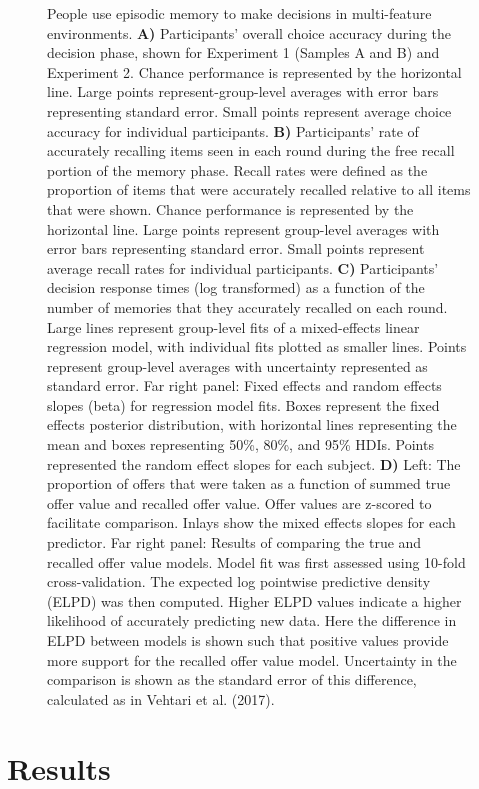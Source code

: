 \documentclass[10pt,letterpaper]{article}
\begin{document}
\begin{figure}[t]
    \caption{People use episodic memory to make decisions in multi-feature environments. \textbf{A)} Participants' overall choice accuracy during the decision phase, shown for Experiment 1 (Samples A and B) and Experiment 2. Chance performance is represented by the horizontal line. Large points represent-group-level averages with error bars representing standard error. Small points represent average choice accuracy for individual participants. \textbf{B)} Participants' rate of accurately recalling items seen in each round during the free recall portion of the memory phase. Recall rates were defined as the proportion of items that were accurately recalled relative to all items that were shown. Chance performance is represented by the horizontal line. Large points represent group-level averages with error bars representing standard error. Small points represent average recall rates for individual participants. \textbf{C)} Participants' decision response times (log transformed) as a function of the number of memories that they accurately recalled on each round. Large lines represent group-level fits of a mixed-effects linear regression model, with individual fits plotted as smaller lines. Points represent group-level averages with uncertainty represented as standard error. Far right panel: Fixed effects and random effects slopes (beta) for regression model fits. Boxes represent the fixed effects posterior distribution, with horizontal lines representing the mean and boxes representing 50\%, 80\%, and 95\% HDIs. Points represented the random effect slopes for each subject. \textbf{D)} Left: The proportion of offers that were taken as a function of summed true offer value and recalled offer value. Offer values are z-scored to facilitate comparison. Inlays show the mixed effects slopes for each predictor. Far right panel: Results of comparing the true and recalled offer value models. Model fit was first assessed using 10-fold cross-validation. The expected log pointwise predictive density (ELPD) was then computed. Higher ELPD values indicate a higher likelihood of accurately predicting new data. Here the difference in ELPD between models is shown such that positive values provide more support for the recalled offer value model. Uncertainty in the comparison is shown as the standard error of this difference, calculated as in Vehtari et al. (2017)\cite{vehtariPracticalBayesianModel2017}.}
    \label{fig:figure2}
\end{figure}

\section{Results}
\end{document}
